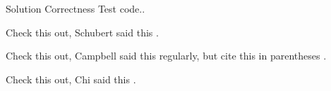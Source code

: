 \documentclass{tise_style}
\begin{document}
Solution Correctness Test code..

Check this out, Schubert said this \cite{Schubert13}.


Check this out, Campbell said this \cite{Campbell02} regularly, but cite this in parentheses \citep{Campbell02}.


Check this out, Chi said this \cite{Chi81}.




\end{document}
